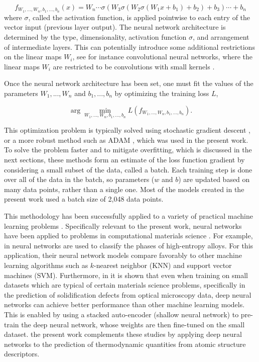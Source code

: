 \begin{equation}
    f_{W_1,...,W_n,b_1,...,b_n}(x) = W_n\cdots\sigma(W_3\sigma(W_2\sigma(W_1x+b_1)+b_2)+b_3)\cdots + b_n
\end{equation}
where $\sigma$, called the activation function, is applied pointwise to each entry of the vector input (previous layer output). The neural network architecture is determined by the type, dimensionality, activation function $\sigma$, and arrangement of intermediate layers. This can potentially introduce some additional restrictions on the linear maps $W_i$, see for instance convolutional neural networks, where the linear maps $W_i$ are restricted to be convolutions with small kernels \cite{krizhevsky2012imagenet,lecun1995comparison,lecun1998gradient}.



Once the neural network architecture has been set, one must fit the values of the parameters $W_1,...,W_n$ and $b_1,...,b_n$ by optimizing the training loss $L$,

\begin{equation}
    \arg\min_{W_1,...,W_n,b_1,...,b_n} L(f_{W_1,...,W_n,b_1,...,b_n}).
\end{equation}

This optimization problem is typically solved using stochastic gradient descent \cite{lecun1998gradient}, or a more robust method such as ADAM \cite{kingma2014adam}, which was used in the present work. To solve the problem faster and to mitigate overfitting, which is discussed in the next sections, these methods form an estimate of the loss function gradient by considering a small subset of the data, called a batch. Each training step is done over all of the data in the batch, so parameters ($w$ and $b$) are updated based on many data points, rather than a single one. Most of the models created in the present work used a batch size of 2,048 data points.

This methodology has been successfully applied to a variety of practical machine learning problems \cite{krizhevsky2012imagenet,goodfellow2013multi,dahl2011context}. Specifically relevant to the present work, neural networks have been applied to problems in computational materials science \cite{Huang2019Machine-learningAlloys,Feng2019UsingDefects}. For example, in \cite{Huang2019Machine-learningAlloys} neural networks are used to classify the phases of high-entropy alloys. For this application, their neural network models compare favorably to other machine learning algorithms such as $k$-nearest neighbor (KNN) and support vector machines (SVM). Furthermore, in \cite{Feng2019UsingDefects} it is shown that even when training on small datasets which are typical of certain materials science problems, specifically in the prediction of solidification defects from optical microscopy data, deep neural networks can achieve better performance than other machine learning models. This is enabled by using a stacked auto-encoder (shallow neural network) to pre-train the deep neural network, whose weights are then fine-tuned on the small dataset. the present work complements these studies by applying deep neural networks to the prediction of thermodynamic quantities from atomic structure descriptors.


